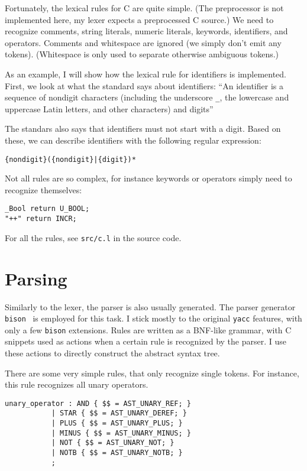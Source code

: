 \documentclass[12pt]{article}
\begin{document}
Fortunately, the lexical rules for C are quite simple. (The preprocessor is not
implemented here, my lexer expects a preprocessed C source.)  We need to
recognize comments, string literals, numeric literals, keywords, identifiers,
and operators. Comments and whitespace are ignored (we simply don't emit any
tokens). (Whitespace is only used to separate otherwise ambiguous tokens.)

As an example, I will show how the lexical rule for identifiers is implemented.
First, we look at what the standard says about identifiers:
``An identifier is a sequence of nondigit characters (including the underscore
\texttt{\_}, the lowercase and uppercase Latin letters, and other characters)
and digits''

The standars also says that identifiers must not start with a digit. Based on
these, we can describe identifiers with the following regular expression:
\begin{center}
\begin{BVerbatim}
{nondigit}({nondigit}|{digit})*
\end{BVerbatim}
\end{center}

Not all rules are so complex, for instance keywords or operators simply need to
recognize themselves:
\begin{center}
\begin{BVerbatim}
_Bool return U_BOOL;
"++" return INCR;
\end{BVerbatim}
\end{center}

For all the rules, see \texttt{src/c.l} in the source code.

\section{Parsing}
Similarly to the lexer, the parser is also usually generated. The parser
generator \texttt{bison}~\cite{bison} is employed for this task. I stick mostly
to the original \texttt{yacc} features, with only a few \texttt{bison}
extensions. Rules are written as a BNF-like grammar, with C snippets used as
actions when a certain rule is recognized by the parser. I use these actions to
directly construct the abstract syntax tree.

There are some very simple rules, that only recognize single tokens. For
instance, this rule recognizes all unary operators.
\begin{center}
\begin{BVerbatim}
unary_operator : AND { $$ = AST_UNARY_REF; }
	       | STAR { $$ = AST_UNARY_DEREF; }
	       | PLUS { $$ = AST_UNARY_PLUS; }
	       | MINUS { $$ = AST_UNARY_MINUS; }
	       | NOT { $$ = AST_UNARY_NOT; }
	       | NOTB { $$ = AST_UNARY_NOTB; }
	       ;
\end{BVerbatim}
\end{center}
\end{document}
